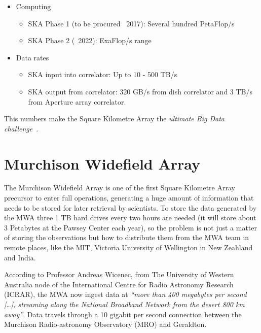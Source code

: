 \begin{itemize}


\item Computing

\begin{itemize}
\item SKA Phase 1 (to be procured ~2017): Several hundred PetaFlop/s
\item SKA Phase 2 (~2022): ExaFlop/s range
\end{itemize}


\item Data rates

\begin{itemize}
\item SKA input into correlator: Up to 10 - 500 TB/s
\item SKA output from correlator: 320 GB/s from dish correlator and 3 TB/s from Aperture array correlator.
\end{itemize}

\end{itemize}

This numbers make the Square Kilometre Array the \emph{ultimate Big Data challenge}~\cite{SKA_01,SKA_02}.




\section{Murchison Widefield Array} %
\label{sec:murchison_widefield_array}

The Murchison Widefield Array is
one of %
the first Square Kilometre Array precursor to enter full operations, generating a huge amount of information that needs to be stored for later retrieval by scientists. To store the data generated by the MWA three 1 TB hard drives every two hours are needed (it will store about 3 Petabytes at the Pawsey Center each year), so the
problem is not %
just a matter of storing the observations but how to distribute them from the MWA team in remote places, like
the MIT, %
Victoria University of Wellington in New Zeahland and India. 

According to Professor Andreas Wicenec, from The University of Western Australia node of the International Centre for Radio Astronomy Research (ICRAR),
the MWA %
now ingest data at \emph{``more than 400 megabytes per second [\dots{}], streaming along the National Broadband Network from the desert 800 km away''}. Data travels through a 10 gigabit per second connection between the Murchison Radio-astronomy Observatory (MRO) and
Geraldton.

